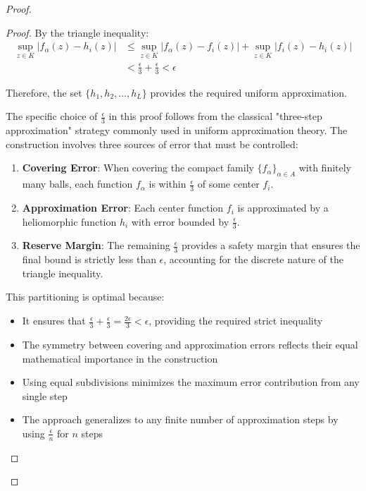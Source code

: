 \begin{proof}
\begin{proof}
By the triangle inequality:
\begin{align}
\sup_{z \in K} |f_{\alpha}(z) - h_i(z)| &\leq \sup_{z \in K} |f_{\alpha}(z) - f_i(z)| + \sup_{z \in K} |f_i(z) - h_i(z)|\\
&< \frac{\epsilon}{3} + \frac{\epsilon}{3} < \epsilon
\end{align}

Therefore, the set $\{h_1, h_2, \ldots, h_L\}$ provides the required uniform approximation.

\begin{remark}
The specific choice of $\frac{\epsilon}{3}$ in this proof follows from the classical "three-step approximation" strategy commonly used in uniform approximation theory. The construction involves three sources of error that must be controlled:

\begin{enumerate}
    \item \textbf{Covering Error}: When covering the compact family $\{f_{\alpha}\}_{\alpha \in A}$ with finitely many balls, each function $f_{\alpha}$ is within $\frac{\epsilon}{3}$ of some center $f_i$.
    
    \item \textbf{Approximation Error}: Each center function $f_i$ is approximated by a heliomorphic function $h_i$ with error bounded by $\frac{\epsilon}{3}$.
    
    \item \textbf{Reserve Margin}: The remaining $\frac{\epsilon}{3}$ provides a safety margin that ensures the final bound is strictly less than $\epsilon$, accounting for the discrete nature of the triangle inequality.
\end{enumerate}

This partitioning is optimal because:
\begin{itemize}
    \item It ensures that $\frac{\epsilon}{3} + \frac{\epsilon}{3} = \frac{2\epsilon}{3} < \epsilon$, providing the required strict inequality
    \item The symmetry between covering and approximation errors reflects their equal mathematical importance in the construction
    \item Using equal subdivisions minimizes the maximum error contribution from any single step
    \item The approach generalizes to any finite number of approximation steps by using $\frac{\epsilon}{n}$ for $n$ steps
\end{itemize}


\end{remark}
\end{proof}
\end{proof}
